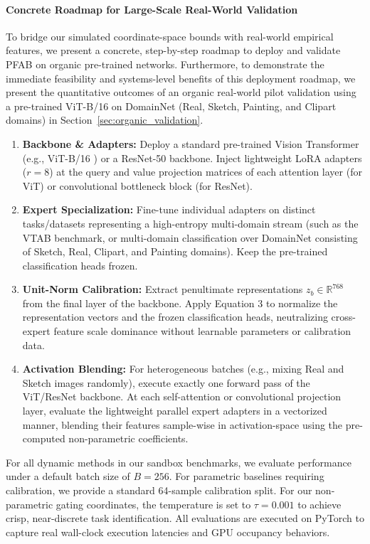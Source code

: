 \paragraph{Concrete Roadmap for Large-Scale Real-World Validation}
To bridge our simulated coordinate-space bounds with real-world empirical features, we present a concrete, step-by-step roadmap to deploy and validate \textsc{PFAB} on organic pre-trained networks. Furthermore, to demonstrate the immediate feasibility and systems-level benefits of this deployment roadmap, we present the quantitative outcomes of an organic real-world pilot validation using a pre-trained ViT-B/16 on DomainNet (Real, Sketch, Painting, and Clipart domains) in Section~\ref{sec:organic_validation}.
\begin{enumerate}
  \item \textbf{Backbone \& Adapters:} Deploy a standard pre-trained Vision Transformer (e.g., ViT-B/16 \cite{dosovitskiy2020image}) or a ResNet-50 \cite{he2016deep} backbone. Inject lightweight LoRA adapters ($r=8$) at the query and value projection matrices of each attention layer (for ViT) or convolutional bottleneck block (for ResNet).
  \item \textbf{Expert Specialization:} Fine-tune individual adapters on distinct tasks/datasets representing a high-entropy multi-domain stream (such as the VTAB benchmark, or multi-domain classification over DomainNet consisting of Sketch, Real, Clipart, and Painting domains). Keep the pre-trained classification heads frozen.
  \item \textbf{Unit-Norm Calibration:} Extract penultimate representations $z_b \in \mathbb{R}^{768}$ from the final layer of the backbone. Apply Equation 3 to normalize the representation vectors and the frozen classification heads, neutralizing cross-expert feature scale dominance without learnable parameters or calibration data.
  \item \textbf{Activation Blending:} For heterogeneous batches (e.g., mixing Real and Sketch images randomly), execute exactly one forward pass of the ViT/ResNet backbone. At each self-attention or convolutional projection layer, evaluate the lightweight parallel expert adapters in a vectorized manner, blending their features sample-wise in activation-space using the pre-computed non-parametric coefficients.
\end{enumerate}

For all dynamic methods in our sandbox benchmarks, we evaluate performance under a default batch size of $B=256$. For parametric baselines requiring calibration, we provide a standard 64-sample calibration split. For our non-parametric gating coordinates, the temperature is set to $\tau = 0.001$ to achieve crisp, near-discrete task identification. All evaluations are executed on PyTorch to capture real wall-clock execution latencies and GPU occupancy behaviors.

